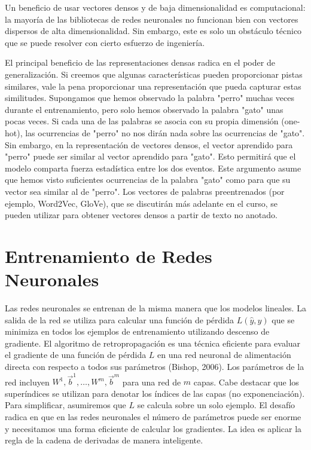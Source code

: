 Un beneficio de usar vectores densos y de baja dimensionalidad es computacional: la mayoría de las bibliotecas de redes neuronales no funcionan bien con vectores dispersos de alta dimensionalidad. Sin embargo, este es solo un obstáculo técnico que se puede resolver con cierto esfuerzo de ingeniería.

El principal beneficio de las representaciones densas radica en el poder de generalización. Si creemos que algunas características pueden proporcionar pistas similares, vale la pena proporcionar una representación que pueda capturar estas similitudes. Supongamos que hemos observado la palabra "perro" muchas veces durante el entrenamiento, pero solo hemos observado la palabra "gato" unas pocas veces. Si cada una de las palabras se asocia con su propia dimensión (one-hot), las ocurrencias de "perro" no nos dirán nada sobre las ocurrencias de "gato". Sin embargo, en la representación de vectores densos, el vector aprendido para "perro" puede ser similar al vector aprendido para "gato". Esto permitirá que el modelo comparta fuerza estadística entre los dos eventos. Este argumento asume que hemos visto suficientes ocurrencias de la palabra "gato" como para que su vector sea similar al de "perro". Los vectores de palabras preentrenados (por ejemplo, Word2Vec, GloVe), que se discutirán más adelante en el curso, se pueden utilizar para obtener vectores densos a partir de texto no anotado.



\section{Entrenamiento de Redes Neuronales}

Las redes neuronales se entrenan de la misma manera que los modelos lineales. La salida de la red se utiliza para calcular una función de pérdida $L(\hat{y},y)$ que se minimiza en todos los ejemplos de entrenamiento utilizando descenso de gradiente. El algoritmo de retropropagación es una técnica eficiente para evaluar el gradiente de una función de pérdida $L$ en una red neuronal de alimentación directa con respecto a todos sus parámetros (Bishop, 2006). Los parámetros de la red incluyen $W^1, \vec{b}^1, \dots, W^m, \vec{b}^m$ para una red de $m$ capas. Cabe destacar que los superíndices se utilizan para denotar los índices de las capas (no exponenciación). Para simplificar, asumiremos que $L$ se calcula sobre un solo ejemplo. El desafío radica en que en las redes neuronales el número de parámetros puede ser enorme y necesitamos una forma eficiente de calcular los gradientes. La idea es aplicar la regla de la cadena de derivadas de manera inteligente.

